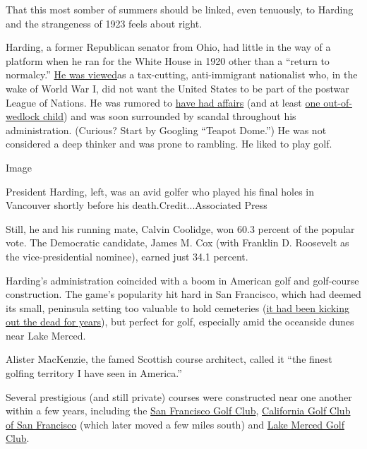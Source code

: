 That this most somber of summers should be linked, even tenuously, to
Harding and the strangeness of 1923 feels about right.

Harding, a former Republican senator from Ohio, had little in the way of
a platform when he ran for the White House in 1920 other than a ``return
to normalcy.''
\href{https://www.whitehouse.gov/about-the-white-house/presidents/warren-g-harding/}{He
was viewed}as a tax-cutting, anti-immigrant nationalist who, in the wake
of World War I, did not want the United States to be part of the postwar
League of Nations. He was rumored to
\href{https://www.nytimes3xbfgragh.onion/2014/07/13/magazine/letters-warren-g-harding.html}{have
had affairs} (and at least
\href{https://www.nytimes3xbfgragh.onion/2015/08/13/us/dna-is-said-to-solve-a-mystery-of-warren-hardings-love-life.html}{one
out-of-wedlock child}) and was soon surrounded by scandal throughout his
administration. (Curious? Start by Googling ``Teapot Dome.'') He was not
considered a deep thinker and was prone to rambling. He liked to play
golf.

Image

President Harding, left, was an avid golfer who played his final holes
in Vancouver shortly before his death.Credit...Associated Press

Still, he and his running mate, Calvin Coolidge, won 60.3 percent of the
popular vote. The Democratic candidate, James M. Cox (with Franklin D.
Roosevelt as the vice-presidential nominee), earned just 34.1 percent.

Harding's administration coincided with a boom in American golf and
golf-course construction. The game's popularity hit hard in San
Francisco, which had deemed its small, peninsula setting too valuable to
hold cemeteries
(\href{https://www.nytimes3xbfgragh.onion/2016/02/06/sports/football/the-town-of-colma-where-san-franciscos-dead-live.html}{it
had been kicking out the dead for years}), but perfect for golf,
especially amid the oceanside dunes near Lake Merced.

Alister MacKenzie, the famed Scottish course architect, called it ``the
finest golfing territory I have seen in America.''

Several prestigious (and still private) courses were constructed near
one another within a few years, including the
\href{https://www.linksmagazine.com/classic-course-san-francisco-golf-club/}{San
Francisco Golf Club}, \href{https://www.calclub.org/\#course}{California
Golf Club of San Francisco} (which later moved a few miles south) and
\href{https://www.lmgc.org/Default.aspx?p=dynamicmodule\&pageid=106\&ssid=100120\&vnf=1\#:~:text=Founded\%20in\%201922\%2C\%20the\%20club,met\%20to\%20begin\%20organizational\%20efforts.}{Lake
Merced Golf Club}.

